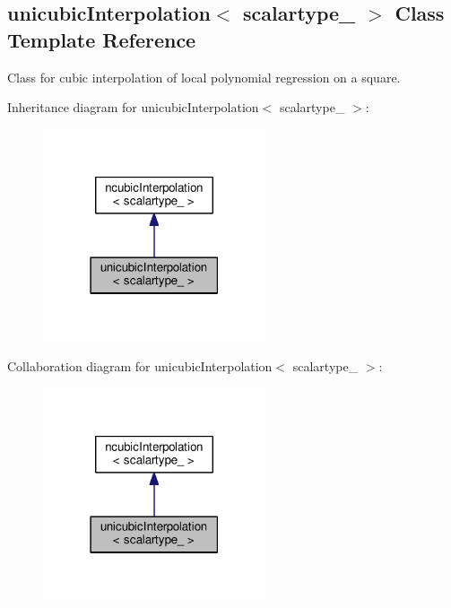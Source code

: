 \hypertarget{classunicubicInterpolation}{}\subsection{unicubic\+Interpolation$<$ scalartype\+\_\+ $>$ Class Template Reference}
\label{classunicubicInterpolation}


Class for cubic interpolation of local polynomial regression on a square.  




Inheritance diagram for unicubic\+Interpolation$<$ scalartype\+\_\+ $>$\+:\nopagebreak
\begin{figure}[H]
\begin{center}
\leavevmode
\includegraphics[width=186pt]{classunicubicInterpolation__inherit__graph}
\end{center}
\end{figure}


Collaboration diagram for unicubic\+Interpolation$<$ scalartype\+\_\+ $>$\+:\nopagebreak
\begin{figure}[H]
\begin{center}
\leavevmode
\includegraphics[width=186pt]{classunicubicInterpolation__coll__graph}
\end{center}
\end{figure}
